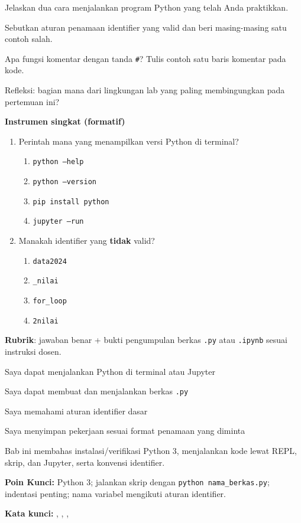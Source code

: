 \documentclass[../main.tex]{subfiles}
\begin{document}
\begin{latihan}
  \item Jelaskan dua cara menjalankan program Python yang telah Anda praktikkan.
  \item Sebutkan aturan penamaan identifier yang valid dan beri masing-masing satu contoh salah.
  \item Apa fungsi komentar dengan tanda \texttt{\#}? Tulis contoh satu baris komentar pada kode.
  \item Refleksi: bagian mana dari lingkungan lab yang paling membingungkan pada pertemuan ini?
\end{latihan}

\begin{asesmen}
\textbf{Instrumen singkat (formatif)}

\begin{enumerate}
  \item Perintah mana yang menampilkan versi Python di terminal?
  \begin{enumerate}
    \item \texttt{python --help}
    \item \texttt{python --version}
    \item \texttt{pip install python}
    \item \texttt{jupyter --run}
  \end{enumerate}
  \item Manakah identifier yang \textbf{tidak} valid?
  \begin{enumerate}
    \item \texttt{data2024}
    \item \texttt{\_nilai}
    \item \texttt{for\_loop}
    \item \texttt{2nilai}
  \end{enumerate}
\end{enumerate}

\textbf{Rubrik}: jawaban benar + bukti pengumpulan berkas \texttt{.py} atau \texttt{.ipynb} sesuai instruksi dosen.
\end{asesmen}

\begin{checklist}
  \item Saya dapat menjalankan Python di terminal atau Jupyter
  \item Saya dapat membuat dan menjalankan berkas \texttt{.py}
  \item Saya memahami aturan identifier dasar
  \item Saya menyimpan pekerjaan sesuai format penamaan yang diminta
\end{checklist}

\begin{rangkuman}
Bab ini membahas instalasi/verifikasi Python 3, menjalankan kode lewat REPL, skrip, dan Jupyter, serta konvensi identifier.

\textbf{Poin Kunci:} Python 3; jalankan skrip dengan \texttt{python nama\_berkas.py}; indentasi penting; nama variabel mengikuti aturan identifier.

\textbf{Kata kunci:} , , , 
\end{rangkuman}
\end{document}
